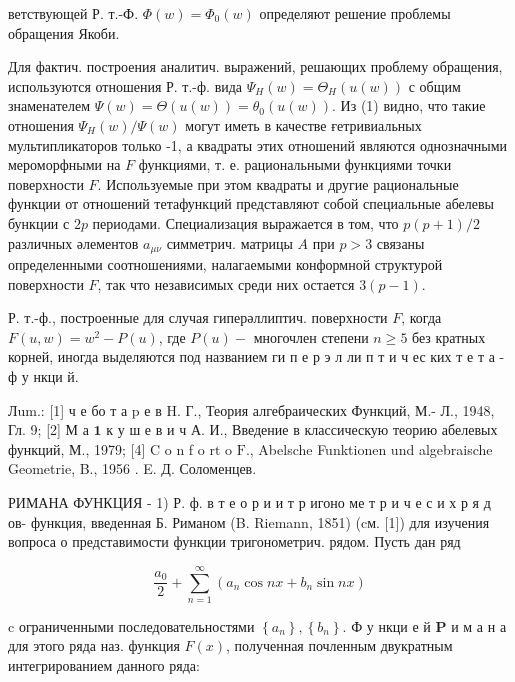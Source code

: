 \documentclass[10pt]{article}
\begin{document}
ветствующей Р. т.-Ф. $\Phi(w)=\Phi_{0}(w)$ определяют решение проблемы обращения Якоби.



Для фактич. построения аналитич. выражений, решающих проблему обращения, используются отношения Р. т.-ф. вида $\Psi_{H}(w)=\Theta_{H}(u(w))$ с общим знаменателем $\Psi(w)=\Theta(u(w))=\theta_{0}(u(w))$. Из (1) видно, что такие отношения $\Psi_{H}(w) / \Psi(w)$ могут иметь в качестве ғетривиальных мультипликаторов только -1, а квадраты этих отношений являются однозначными мероморфными на $F$ функциями, т. е. рациональными функциями точки поверхности $F$. Используемые при этом квадраты и другие рациональные функции от отношений тетафункций представляют собой специальные абелевы бункции с $2 p$ периодами. Специализация выражается в том, что $p(p+1) / 2$ различных әлементов $a_{\mu \nu}$ симметрич. матрицы $A$ при $p>3$ связаны определенными соотношениями, налагаемыми конформной структурой поверхности $F$, так что независимых среди них остается $3(p-1)$.



Р. т.-ф., построенные для случая гиперәллиптич. поверхности $F$, когда $F(u, w)=w^{2}-P(u)$, где $P(u)-$ многочлен степени $n \geqslant 5$ без кратных корней, иногда выделяются под названием ги п е р э л ли п т и ч ес ких т е т а - ф у нкци й.



Лum.: [1] ч е бо т а p е в H. Г., Теория алгебраических Функций, М.- Л., 1948, Гл. 9; [2] М а $\mathbf{1}$ к у ш е в и ч А. И., Введение в классическую теорию абелевых функций, М., 1979; [4] $\mathrm{C}$ o $\mathrm{n}$ f o $\mathrm{r} \mathrm{t}$ o $\mathrm{F}$., Abelsche Funktionen und algebraische Geometrie, B., 1956 . E. Д. Соломенцев.



РИМАНА ФУНКЦИЯ - 1) Р. ф. в т е о р и и т р игоно ме т р и ч е с и х р я д ов- функция, введенная Б. Риманом (B. Riemann, 1851) (cм. [1]) для изучения вопроса о представимости функции тригонометрич. рядом. Пусть дан ряд



\[

\frac{a_{0}}{2}+\sum_{n=1}^{\infty}\left(a_{n} \cos n x+b_{n} \sin n x\right)

\]



c ограниченными последовательностями $\left\{a_{n}\right\},\left\{b_{n}\right\}$. Ф у нкци е й $\mathbf{P}$ и м а н а для этого ряда наз. функция $F(x)$, полученная почленным двукратным интегрированием данного ряда:
\end{document}
